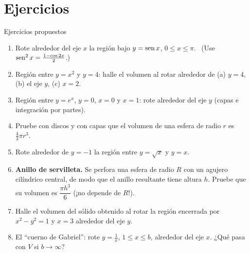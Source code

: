 \documentclass[10pt,aspectratio=169]{beamer}
\begin{document}
\section{Ejercicios}

\begin{frame}{Ejercicios propuestos}
  \small
  \begin{ejercicio}
    \begin{enumerate}
      \item Rote alrededor del eje $x$ la región bajo $y=\operatorname{sen} x$, $0\le x\le\pi$. \ (Use $\operatorname{sen}^2x=\frac{1-\cos2x}{2}$.)
      \item Región entre $y=x^2$ y $y=4$: halle el volumen al rotar alrededor de (a) $y=4$, (b) el eje $y$, (c) $x=2$.
      \item Región entre $y=e^x$, $y=0$, $x=0$ y $x=1$: rote alrededor del eje $y$ (capas e integración por partes).
      \item Pruebe con discos y con capas que el volumen de una esfera de radio $r$ es $\frac43\pi r^3$.
      \item Rote alrededor de $y=-1$ la región entre $y=\sqrt x$ y $y=x$.
      \item \textbf{Anillo de servilleta.} Se perfora una esfera de radio $R$ con un agujero cilíndrico central, de modo que
        el anillo resultante tiene altura $h$. Pruebe que su volumen es $\dfrac{\pi h^3}{6}$ (¡no depende de $R$!).
      \item Halle el volumen del sólido obtenido al rotar la región encerrada por $x^2-y^2=1$ y $x=3$ alrededor del eje $y$.
      \item El ``cuerno de Gabriel'': rote $y=\frac1x$, $1\le x\le b$, alrededor del eje $x$. ¿Qué pasa con $V$ si $b\to\infty$?
    \end{enumerate}
  \end{ejercicio}
\end{frame}
\end{document}
